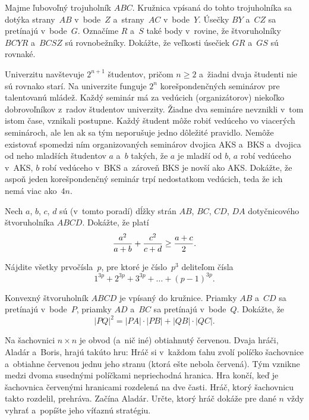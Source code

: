 {%
Majme ľubovoľný trojuholník $ABC$. Kružnica vpísaná do tohto trojuholníka sa dotýka strany~$AB$ v~bode~$Z$ a~strany~$AC$ v~bode~$Y$. Úsečky $BY$ a~$CZ$ sa pretínajú v~bode~$G$. Označíme $R$ a~$S$ také body v~rovine, že štvoruholníky $BCYR$ a~$BCSZ$ sú rovnobežníky. Dokážte, že veľkosti úsečiek $GR$ a~$GS$ sú rovnaké.
}

{%
Univerzitu navštevuje $2^{n+1}$ študentov, pričom  $n\ge2$ a~žiadni
dvaja študenti nie sú rovnako starí. Na univerzite funguje $2^n$
korešpondenčných seminárov pre talentovanú mládež. Každý seminár má za
vedúcich (organizátorov) niekoľko dobrovoľníkov z~radov
študentov univerzity. Žiadne dva semináre nevznikli v~tom istom čase,
vznikali postupne. Každý študent môže robiť vedúceho vo viacerých
seminároch, ale len ak sa tým neporušuje jedno dôležité pravidlo.
Nemôže existovať spomedzi ním organizovaných seminárov dvojica AKS a~BKS a~dvojica od neho mladších študentov $a$ a~$b$ takých, že $a$ je
mladší od $b$, $a$ robí vedúceho v~AKS, $b$ robí vedúceho v~BKS a~zároveň BKS je novší ako AKS. Dokážte, že aspoň jeden
korešpondenčný seminár trpí nedostatkom vedúcich, teda že ich nemá
viac ako~$4n$.
}

{%
Nech $a$, $b$, $c$, $d$ sú (v~tomto poradí) dĺžky strán $AB$, $BC$, $CD$, $DA$ dotyčnicového štvoruholníka $ABCD$. Dokážte, že platí
$$
{a^2\over a+b}+{c^2\over c+d}\ge {a+c\over 2}.
$$
}

{%
Nájdite všetky prvočísla~$p$, pre ktoré je číslo~$p^3$ deliteľom čísla
$$
1^{3p}+2^{3p}+3^{3p}+\dots+(p-1)^{3p}.
$$
}

{%
Konvexný štvoruholník $ABCD$ je vpísaný do kružnice. Priamky $AB$ a~$CD$ sa pretínajú v~bode~$P$,
priamky $AD$ a~$BC$ sa pretínajú v~bode~$Q$. Dokážte, že
$$
|PQ|^2=|PA|\cdot |PB| + |QB|\cdot |QC|.
$$
}

{%
Na šachovnici $n\times n$ je obvod (a~nič iné) obtiahnutý červenou.
Dvaja hráči, Aladár a~Boris, hrajú takúto hru: Hráč si v~každom ťahu zvolí políčko šachovnice
a~obtiahne červenou jednu jeho stranu (ktorá ešte nebola červená). Tým vznikne medzi dvoma susednými políčkami nepriechodná hranica.
Hra končí, keď je šachovnica červenými hranicami rozdelená na dve časti.
Hráč, ktorý šachovnicu takto rozdelil, prehráva. Začína Aladár. Určte, ktorý hráč dokáže pre dané $n$ vždy vyhrať a~popíšte jeho víťaznú stratégiu.
}

